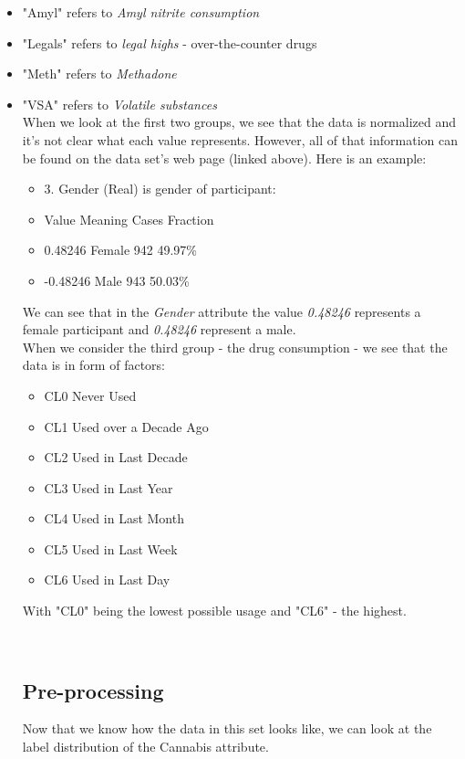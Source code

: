 \documentclass{article}\usepackage[]{graphicx}\usepackage[]{color}
\begin{document}
\begin{itemize}
\item "Amyl" refers to \textit{Amyl nitrite consumption}
\item "Legals" refers to \textit{legal highs} - over-the-counter drugs
\item "Meth" refers to \textit{Methadone}
\item "VSA" refers to \textit{Volatile substances}
\\

When we look at the first two groups, we see that the data is normalized and it's not clear what each value represents. However, all of that information can be found on the data set's web page (linked above). Here is an example:

\begin{itemize}
\item 3. Gender (Real) is gender of participant: 
\item  Value    Meaning Cases Fraction 
\item  0.48246  Female  942   49.97\% 
\item -0.48246  Male    943   50.03\% 
\end{itemize}
We can see that in the \textit{Gender} attribute the value \textit{0.48246} represents a female participant and \textit{0.48246} represent a male.
\\

When we consider the third group - the drug consumption - we see that the data is in form of factors:
\begin{itemize}
\item CL0 Never Used
\item CL1 Used over a Decade Ago
\item CL2 Used in Last Decade 
\item CL3 Used in Last Year 
\item CL4 Used in Last Month
\item CL5 Used in Last Week 
\item CL6 Used in Last Day
\end{itemize}
With "CL0" being the lowest possible usage and "CL6" - the highest.

\\
\subsection{Pre-processing}
Now that we know how the data in this set looks like, we can look at the label distribution of the Cannabis attribute.


\end{itemize}
\end{document}

